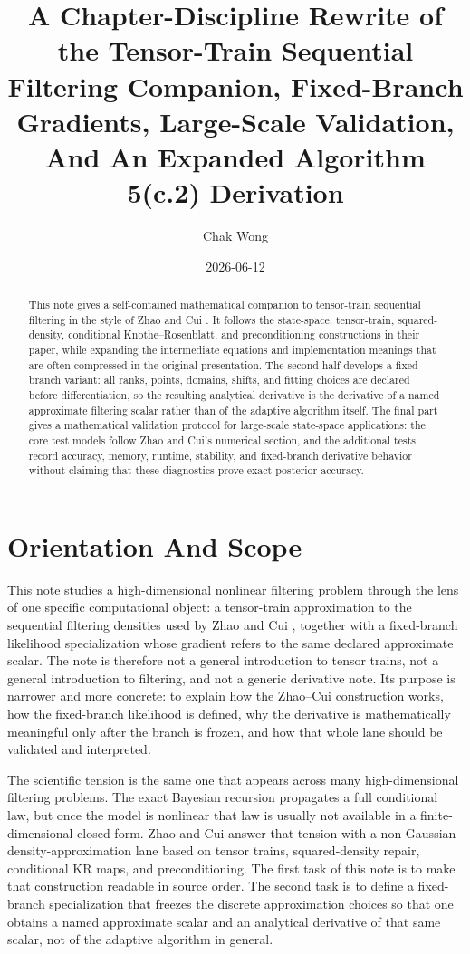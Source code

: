 \documentclass[11pt]{article}
\title{A Chapter-Discipline Rewrite of the Tensor-Train Sequential Filtering Companion, Fixed-Branch Gradients, Large-Scale Validation, And An Expanded Algorithm 5(c.2) Derivation}
\author{Chak Wong}
\date{2026-06-12}
\numberwithin{equation}{section}
\begin{document}
\maketitle

\begin{abstract}
This note gives a self-contained mathematical companion to tensor-train
sequential filtering in the style of Zhao and Cui \cite{zhao2024ttsequential}.
It follows the state-space, tensor-train, squared-density, conditional
Knothe--Rosenblatt, and preconditioning constructions in their paper, while
expanding the intermediate equations and implementation meanings that are often
compressed in the original presentation.  The second half develops a fixed
branch variant: all ranks, points, domains, shifts, and fitting choices are
declared before differentiation, so the resulting analytical derivative is the
derivative of a named approximate filtering scalar rather than of the adaptive
algorithm itself.  The final part gives a mathematical validation protocol for
large-scale state-space applications: the core test models follow Zhao and
Cui's numerical section, and the additional tests record accuracy, memory,
runtime, stability, and fixed-branch derivative behavior without claiming that
these diagnostics prove exact posterior accuracy.
\end{abstract}

\tableofcontents

\section{Orientation And Scope}

This note studies a high-dimensional nonlinear filtering problem through the lens
of one specific computational object: a tensor-train approximation to the
sequential filtering densities used by Zhao and Cui \cite{zhao2024ttsequential},
together with a fixed-branch likelihood specialization whose gradient
refers to the same declared approximate scalar.  The note is therefore not a
general introduction to tensor trains, not a general introduction to filtering,
and not a generic derivative note.  Its purpose is narrower and more concrete:
to explain how the Zhao--Cui construction works, how the fixed-branch likelihood is
defined, why the derivative is mathematically meaningful only after the branch is
frozen, and how that whole lane should be validated and interpreted.

The scientific tension is the same one that appears across many high-dimensional
filtering problems.  The exact Bayesian recursion propagates a full conditional
law, but once the model is nonlinear that law is usually not available in a
finite-dimensional closed form.  Zhao and Cui answer that tension with a
non-Gaussian density-approximation lane based on tensor trains, squared-density
repair, conditional KR maps, and preconditioning.  The first task of this note is
to make that construction readable in source order.  The second task is to define
a fixed-branch specialization that freezes the discrete approximation choices so
that one obtains a named approximate scalar and an analytical derivative of that
same scalar, not of the adaptive algorithm in general.
\end{document}
